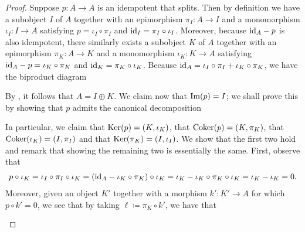 \noindent\begin{proof} Suppose $p : A \to A$ is an idempotent that splits. Then by definition we have a subobject $I$ of $A$ together with an epimorphism $\pi_I : A \to I$ and a monomorphism $\iota_I : I \to A$ satisfying $p = \iota_I \circ \pi_I$ and $\textnormal{id}_{I} = \pi_I \circ \iota_I$. Moreover, because $\textnormal{id}_A - p$ is also idempotent, there similarly exists a subobject $K$ of $A$ together with an epimorphism $\pi_K : A \to K$ and a monomorphism $\iota_K : K \to A$ satisfying $\textnormal{id}_A - p = \iota_K \circ \pi_K$ and $\textnormal{id}_{K} = \pi_K \circ \iota_K$. Because $\textnormal{id}_A = \iota_I \circ \pi_I + \iota_K \circ \pi_K$, we have the biproduct diagram
\begin{center}
\end{center}
\noindent By \cite[Theorem VIII.2.2]{Mac13}, it follows that $A = I \oplus K$. We claim now that $\textnormal{Im}(p) = I$; we shall prove this by showing that $p$ admits the canonical decomposition
\begin{center}
\end{center}
\noindent In particular, we claim that $\textnormal{Ker}(p) = (K, \iota_K)$, that $\textnormal{Coker}(p) = (K, \pi_K)$, that $\textnormal{Coker}(\iota_K) = (I, \pi_I)$ and that $\textnormal{Ker}(\pi_K) = (I, \iota_I)$. We show that the first two hold and remark that showing the remaining two is essentially the same. First, observe that
\begin{align*}
\begin{split}
p \circ \iota_K = \iota_I \circ \pi_I \circ \iota_K = (\textnormal{id}_A - \iota_K \circ \pi_K) \circ \iota_K = \iota_K - \iota_K \circ \pi_K \circ \iota_K = \iota_K - \iota_K = 0.
\end{split}
\end{align*}
\noindent Moreover, given an object $K'$ together with a morphism $k' : K' \to A$ for which $p \circ k' = 0$, we see that by taking $\ell \coloneqq \pi_K \circ k'$, we have that
\begin{align*}
\begin{split}

\end{split}
\end{align*}
\end{proof}

